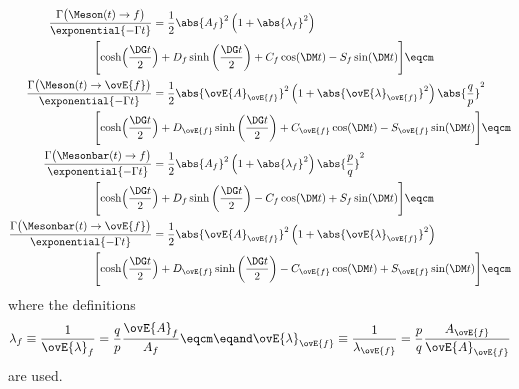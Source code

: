 \begin{equation}\label{eq:cpv_theory:flavour_physics:time_evolution:differential_decay_rates}
  \begin{split}
    \frac{\Gamma \bigl(\Meson   (t) \to       f \bigr)}{\exponential{-\Gamma t}} &= 
      \frac{1}{2} \abs{A_f}^2 \left( 1 + \abs{\lambda_f}^2 \right) \\
        \Biggl[ \cosh\Bigl(\frac{\DG t}{2}&\Bigr) + D_f \sinh\left(\frac{\DG t}{2}\right) + C_f \cos(\DM t) - S_f \sin(\DM t) \Biggr]\eqcm \\
    \frac{\Gamma \bigl(\Meson   (t) \to \ovE{f} \bigr)}{\exponential{-\Gamma t}} &= 
      \frac{1}{2} \abs{\ovE{A}_{\ovE{f}}}^2 \left( 1 + \abs{\ovE{\lambda}_{\ovE{f}}}^2 \right) \abs{\frac{q}{p}}^2 \\
        \Biggl[ \cosh\Bigl(\frac{\DG t}{2}&\Bigr) + D_{\ovE{f}} \sinh\left(\frac{\DG t}{2}\right) + C_{\ovE{f}} \cos(\DM t) - S_{\ovE{f}} \sin(\DM t) \Biggr]\eqcm \\
    \frac{\Gamma \bigl(\Mesonbar(t) \to       f \bigr)}{\exponential{-\Gamma t}} &= 
      \frac{1}{2} \abs{A_f}^2 \left( 1 + \abs{\lambda_f}^2 \right) \abs{\frac{p}{q}}^2 \\
        \Biggl[ \cosh\Bigl(\frac{\DG t}{2}&\Bigr) + D_f \sinh\left(\frac{\DG t}{2}\right) - C_f \cos(\DM t) + S_f \sin(\DM t) \Biggr]\eqcm \\
    \frac{\Gamma \bigl(\Mesonbar(t) \to \ovE{f} \bigr)}{\exponential{-\Gamma t}} &= 
      \frac{1}{2} \abs{\ovE{A}_{\ovE{f}}}^2 \left( 1 + \abs{\ovE{\lambda}_{\ovE{f}}}^2 \right) \\
        \Biggl[ \cosh\Bigl(\frac{\DG t}{2}&\Bigr) + D_{\ovE{f}} \sinh\left(\frac{\DG t}{2}\right) - C_{\ovE{f}} \cos(\DM t) + S_{\ovE{f}} \sin(\DM t) \Biggr]\eqcm \\
  \end{split}
\end{equation}
%
where the definitions
%
\begin{equation}\label{eq:cpv_theory:flavour_physics:time_evolution:lambdaf}
  \lambda_f               \equiv \frac{1}{\ovE{\lambda}_f}   = \frac{q}{p} \frac{\ovE{A}_f}{A_f}                 \eqcm \eqand 
  \ovE{\lambda}_{\ovE{f}} \equiv \frac{1}{\lambda_{\ovE{f}}} = \frac{p}{q} \frac{A_{\ovE{f}}}{\ovE{A}_{\ovE{f}}}
\end{equation}
%
are used.

